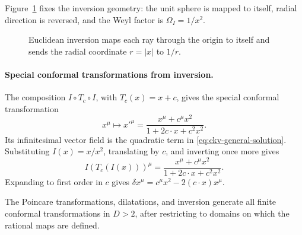 Figure~\ref{fig:euclidean-inversion-unit-sphere} fixes the inversion geometry:
the unit sphere is mapped to itself, radial direction is reversed, and the Weyl
factor is \(\Omega_I=1/x^2\).

\begin{figure}[H]
  \centering
  \caption{Euclidean inversion maps each ray through the origin to itself and
  sends the radial coordinate \(r=|x|\) to \(1/r\).}
  \label{fig:euclidean-inversion-unit-sphere}
\end{figure}

\paragraph{Special conformal transformations from inversion.}
The composition \(I\circ T_c\circ I\), with \(T_c(x)=x+c\), gives the special
conformal transformation
\begin{equation}
  x^\mu
  \longmapsto
  x'^\mu
  =
  \frac{x^\mu+c^\mu x^2}{1+2c\cdot x+c^2x^2}.
  \label{eq:finite-special-conformal}
\end{equation}
Its infinitesimal vector field is the quadratic term in
\eqref{eq:ckv-general-solution}.
Substituting \(I(x)=x/x^2\), translating by \(c\), and inverting once more
gives
\[
  I(T_c(I(x)))^\mu
  =
  \frac{x^\mu+c^\mu x^2}{1+2c\cdot x+c^2x^2}.
\]
Expanding to first order in \(c\) gives
\(\delta x^\mu=c^\mu x^2-2(c\cdot x)x^\mu\).

The Poincare transformations, dilatations, and inversion generate all finite
conformal transformations in \(D>2\), after restricting to domains on which
the rational maps are defined.

